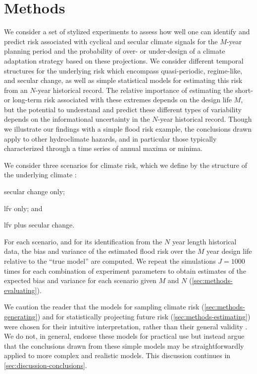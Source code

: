 \documentclass[
  draft,
  linenumbers
]{agujournal2018}
\begin{document}

\section{Methods}\label{sec:methods}

We consider a set of stylized experiments to assess how well one can identify and predict risk associated with cyclical and secular climate signals for the $M$-year planning period and the probability of over- or under-design of a climate adaptation strategy based on these projections.
We consider different temporal structures for the underlying risk which encompass quasi-periodic, regime-like, and secular change, as well as simple statistical models for estimating this risk from an $N$-year historical record.
The relative importance of estimating the short- or long-term risk associated with these extremes depends on the design life $M$, but the potential to understand and predict these different types of variability depends on the informational uncertainty in the $N$-year historical record.
Though we illustrate our findings with a simple flood risk example, the conclusions drawn apply to other hydroclimate hazards, and in particular those typically characterized through a time series of annual maxima or minima.

We consider three scenarios for climate risk, which we define by the structure of the underlying climate :
\begin{enumerate*}[label= (\roman*)]
  \item secular change only;
  \item \gls{lfv} only; and
  \item \gls{lfv} plus secular change.
\end{enumerate*}
For each scenario, and for its identification from the $N$ year length historical data, the bias and variance of the estimated flood risk over the $M$ year design life relative to the ``true model'' are computed.
We repeat the simulations $J = 1000$ times for each combination of experiment parameters to obtain estimates of the expected bias and variance for each scenario given $M$ and $N$ (\cref{sec:methods-evaluating}).

We caution the reader that the models for sampling climate risk (\cref{sec:methods-generating}) and for statistically projecting future risk (\cref{sec:methods-estimating}) were chosen for their intuitive interpretation, rather than their general validity \citep[see][for a thoughtful discussion of the value of simple models]{Held:2005cj}.
We do not, in general, endorse these models for practical use but instead argue that the conclusions drawn from these simple models may be straightforwardly applied to more complex and realistic models.
This discussion continues in \cref{sec:discussion-conclusions}.
\end{document}
